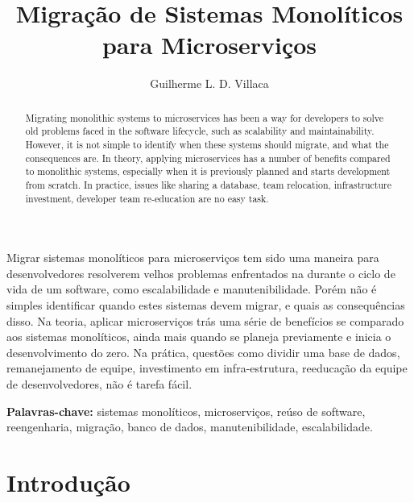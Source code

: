\documentclass[12pt]{article}
\title{Migração de Sistemas Monolíticos para Microserviços}
\author{Guilherme L. D. Villaca\inst{1}}
\begin{document}
 

\maketitle

\begin{abstract}
Migrating monolithic systems to microservices has been a way for developers to solve old problems faced in the software lifecycle, such as scalability and maintainability. However, it is not simple to identify when these systems should migrate, and what the consequences are. In theory, applying microservices has a number of benefits compared to monolithic systems, especially when it is previously planned and starts development from scratch. In practice, issues like sharing a database, team relocation, infrastructure investment, developer team re-education are no easy task.
\end{abstract}
     
\begin{resumo} 
Migrar sistemas monolíticos para microserviços tem sido uma maneira para desenvolvedores resolverem velhos problemas enfrentados na durante o ciclo de vida de um software, como escalabilidade e manutenibilidade. Porém não é simples identificar quando estes sistemas devem migrar, e quais as consequências disso. Na teoria, aplicar microserviços trás uma série de benefícios se comparado aos sistemas monolíticos, ainda mais quando se planeja previamente e inicia o desenvolvimento do zero. Na prática, questões como dividir uma base de dados, remanejamento de equipe, investimento em infra-estrutura, reeducação da equipe de desenvolvedores, não é tarefa fácil.
\end{resumo}

{\bf Palavras-chave:} sistemas monolíticos, microserviços, reúso de software, reengenharia, migração, banco de dados, manutenibilidade, escalabilidade.


\section{Introdução}

\end{document}
